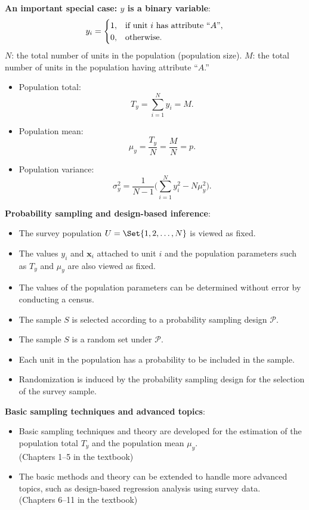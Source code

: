 \documentclass[oneside]{book}\usepackage[]{graphicx}\usepackage[svgnames]{xcolor}
\providecommand{\Vector}[1]{\bm{#1}}%
\begin{document}
\textbf{An important special case: $y$ is a binary variable}:
\[ y_i=\begin{cases}
            1, & \text{if unit $ i $ has attribute ``$A$''}, \\
            0, & \text{otherwise}.
      \end{cases} \]
$ N $: the total number of units in the population (population size).
$ M $: the total number of units in the population having attribute ``$A$.''
\begin{itemize}
      \item Population total:
            \[ T_y=\sum_{i=1}^{N}y_i=M. \]
      \item Population mean:
            \[ \mu_y=\frac{T_y}{N}=\frac{M}{N}=p. \]
      \item Population variance:
            \[ \sigma_y^2=\frac{1}{N-1}\biggl(\sum_{i=1}^{N}y_i^2-N\mu_y^2\biggr). \]
\end{itemize}
\textbf{Probability sampling and design-based inference}:
\begin{itemize}
      \item The survey population $ U=\Set{1,2,\ldots,N} $ is viewed as fixed.
      \item The values $ y_i $ and $ \Vector{x}_i $ attached to unit $ i $
            and the population parameters such as $ T_y $ and $ \mu_y $
            are also viewed as fixed.
      \item The values of the population parameters can be determined without error by conducting
            a census.
      \item The sample $ S $ is selected according to a probability sampling design $ \mathcal{P} $.
      \item The sample $ S $ is a random set under $ \mathcal{P} $.
      \item Each unit in the population has a probability to be included in the
            sample.
      \item Randomization is induced by the probability sampling design for
            the selection of the survey sample.
\end{itemize}
\textbf{Basic sampling techniques and advanced topics}:
\begin{itemize}
      \item Basic sampling techniques and theory are developed for the
            estimation of the population total $T_y$ and the population mean $ \mu_y $.\\
            (Chapters 1--5 in the textbook)
      \item The basic methods and theory can be extended to handle more
            advanced topics, such as design-based regression analysis using
            survey data.\\
            (Chapters 6--11 in the textbook)
\end{itemize}
\end{document}
